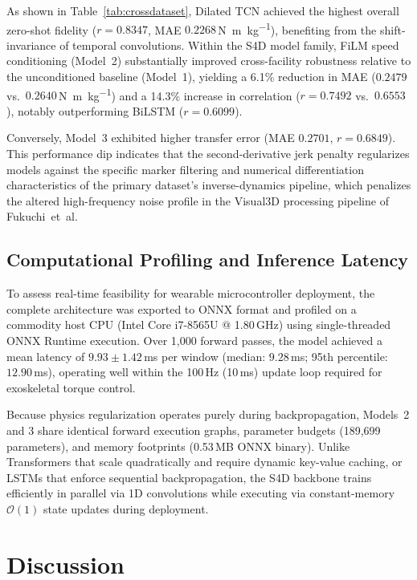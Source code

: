 \documentclass[fleqn,10pt]{wlscirep}
\newcommand{\Nmskg}{\si{\newton\metre\per\kilogram}}
\begin{document}
As shown in Table~\ref{tab:crossdataset}, Dilated TCN achieved the highest overall zero-shot fidelity ($r = 0.8347$, MAE $0.2268$\,\Nmskg{}), benefiting from the shift-invariance of temporal convolutions. Within the S4D model family, FiLM speed conditioning (Model~2) substantially improved cross-facility robustness relative to the unconditioned baseline (Model~1), yielding a 6.1\% reduction in MAE ($0.2479$ vs.\ $0.2640$\,\Nmskg{}) and a 14.3\% increase in correlation ($r = 0.7492$ vs.\ $0.6553$), notably outperforming BiLSTM ($r = 0.6099$).

Conversely, Model~3 exhibited higher transfer error (MAE $0.2701$, $r = 0.6849$). This performance dip indicates that the second-derivative jerk penalty regularizes models against the specific marker filtering and numerical differentiation characteristics of the primary dataset's inverse-dynamics pipeline, which penalizes the altered high-frequency noise profile in the Visual3D processing pipeline of Fukuchi~et~al.

\subsection{Computational Profiling and Inference Latency}

To assess real-time feasibility for wearable microcontroller deployment, the complete architecture was exported to ONNX format and profiled on a commodity host CPU (Intel Core i7-8565U @ 1.80\,GHz) using single-threaded ONNX Runtime execution. Over 1,000 forward passes, the model achieved a mean latency of $9.93 \pm 1.42$\,\si{\milli\second} per window (median: $9.28$\,\si{\milli\second}; 95th percentile: $12.90$\,\si{\milli\second}), operating well within the 100\,Hz (10\,ms) update loop required for exoskeletal torque control.

Because physics regularization operates purely during backpropagation, Models~2 and 3 share identical forward execution graphs, parameter budgets (189,699 parameters), and memory footprints (0.53\,MB ONNX binary). Unlike Transformers that scale quadratically and require dynamic key-value caching, or LSTMs that enforce sequential backpropagation, the S4D backbone trains efficiently in parallel via 1D convolutions while executing via constant-memory $\mathcal{O}(1)$ state updates during deployment.

\section{Discussion}
\end{document}
